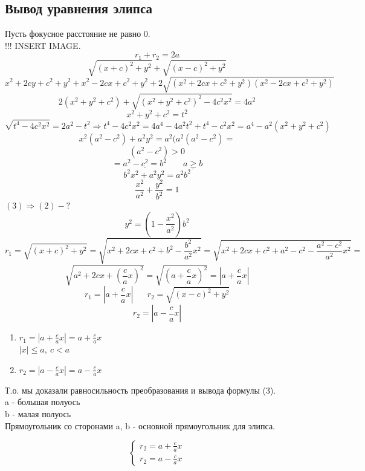 \documentclass[12pt, paper]{article}
\begin{document}
\subsection{Вывод уравнения элипса}
Пусть фокусное расстояние не равно 0.\\
!!! INSERT IMAGE.\\
\begin{equation}
	r_1 + r_2 = 2a
	\label{eq:Вывод}
\end{equation}
\begin{equation}	
	\sqrt{ (x + c)^2 + y^2 } + \sqrt{(x - c)^2 + y^2}
	\label{eq:}
\end{equation}
\[	x^2 + 2cy + c^2 + y^2 + x^2 - 2cx + c^2 + y^2  + 2\sqrt{(x^2 + 2cx + c^2 + y^2)(x^2 - 2cx + c^2 + y^2)} \]
\[ 2( x^2 + y^2 + c^2) + \sqrt{(x^2 + y^2 + c^2) ^ 2 - 4c^2x^2} = 4a^2 \]
\[ x^2 + y^2 + c^2 = t^2 \]
\[ \sqrt{t^4 - 4c^2x^2} = 2a^2 - t^2 \Rightarrow t^4 - 4c^2x^2 = 4a^4 - 4a^2t^2 + t^4 - c^2x^2 = a^4 - a^2(x^2 + y^2 + c^2) \]
\[ x^2(a^2 - c^2) + a^2y^2 = a^2(a^2(a^2-c^2) = \]
\[ (a^2 - c^2) > 0 \]
\[ = \underline{a^2 - c^2 = b^2}\;\;\;\;\;\;\; \underline{a  \geq b} \]
\[ b^2x^2 + a^2y^2 = a^2b^2 \]
\begin{equation}
	\frac{x^2}{a^2} + \frac{y^2}{b^2} = 1
	\label{eq:}
\end{equation}
$(3) \Rightarrow (2) - ?$\\
\[ y^2 = (1 - \frac{x^2}{a^2})b^2 \]
\[ r_1 = \sqrt{(x+c)^2 + y^2} = \sqrt{x^2 + 2cx + c^2 + b^2 - \frac{b^2}{a^2}x^2} = \sqrt{x^2 + 2cx + c^2 + a^2 - c^2 - \frac{a^2 - c^2}{a^2}x^2} =\]
\[\sqrt{a^2 + 2cx + (\frac{c}{a}x)^2} = \sqrt{(a + \frac{c}{a}x)^2} = |a + \frac{c}{a}x| \]
\[ r_1 = |a + \frac{c}{a}x| \;\;\;\;\;\; r_2 = \sqrt{(x - c)^2 + y^2} \]
\[ r_2 = |a - \frac{c}{a}x| \]
\begin{enumerate}
	\item $r_1 = |a + \frac{c}{a}x| = a + \frac{c}{a}x$\\
		$|x| \leq a,\ c < a$
	\item $r_2 = |a - \frac{c}{a}x| = a - \frac{c}{a}x$
\end{enumerate}
Т.о. мы доказали равносильность преобразования и вывода формулы (3).\\
a - большая полуось\\
b - малая полуось\\
Прямоугольник со сторонами a, b - основной прямоугольник для элипса.

\begin{equation}
	\begin{cases}
		r_2 = a + \frac{c}{a}x\\
		r_2 = a - \frac{c}{a}x
	\end{cases}
	\label{eq:}
\end{equation}
\end{document}
